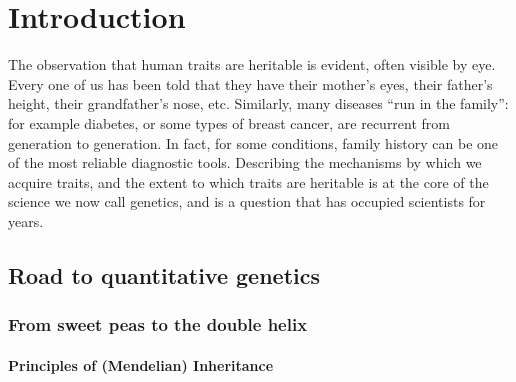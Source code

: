 \chapter{Introduction}  %

The observation that human traits are heritable is evident, often visible by eye. 
Every one of us has been told that they have their mother’s eyes, their father’s height, their grandfather’s nose, etc. 
Similarly, many diseases “run in the family”: for example diabetes, or some types of breast cancer, are recurrent from generation to generation. 
In fact, for some conditions, family history can be one of the most reliable diagnostic tools. 
Describing the mechanisms by which we acquire traits, and the extent to which traits are heritable is at the core of the science we now call genetics, and is a question that has occupied scientists for years.

\section{Road to quantitative genetics}  %

\subsection{From sweet peas to the double helix} %
\subsubsection{Principles of (Mendelian) Inheritance}

